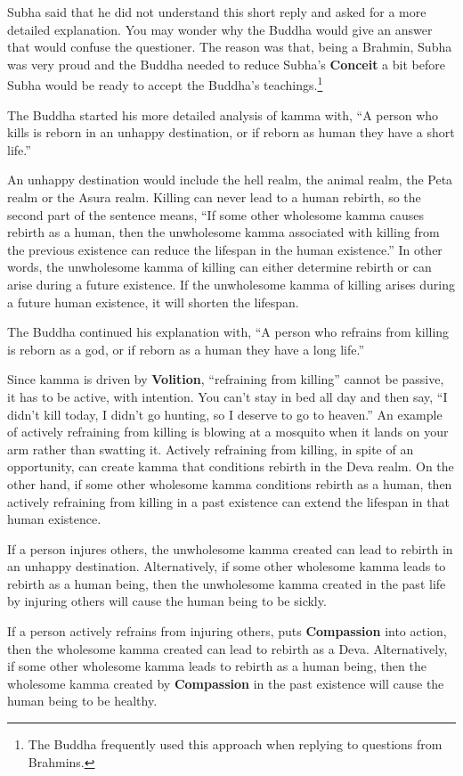 Subha said that he did not understand this short reply and asked for a more detailed explanation. You may wonder why the Buddha would give an answer that would confuse the questioner. The reason was that, being a Brahmin, Subha was very proud and the Buddha needed to reduce Subha’s \textbf{Conceit} a bit before Subha would be ready to accept the Buddha’s teachings.\footnote{The Buddha frequently used this approach when replying to questions from Brahmins.}

The Buddha started his more detailed analysis of kamma with, “A person who kills is reborn in an unhappy destination, or if reborn as human they have a short life.” 

An unhappy destination would include the hell realm, the animal realm, the Peta realm or the Asura realm. Killing can never lead to a human rebirth, so the second part of the sentence means, “If some other wholesome kamma causes rebirth as a human, then the unwholesome kamma associated with killing from the previous existence can reduce the lifespan in the human existence.” In other words, the unwholesome kamma of killing can either determine rebirth or can arise during a future existence. If the unwholesome kamma of killing arises during a future human existence, it will shorten the lifespan.

The Buddha continued his explanation with, “A person who refrains from killing is reborn as a god, or if reborn as a human they have a long life.” 

Since kamma is driven by \textbf{Volition}, “refraining from killing” cannot be passive, it has to be active, with intention. You can’t stay in bed all day and then say, “I didn’t kill today, I didn’t go hunting, so I deserve to go to heaven.” An example of actively refraining from killing is blowing at a mosquito when it lands on your arm rather than swatting it. Actively refraining from killing, in spite of an opportunity, can create kamma that conditions rebirth in the Deva realm. On the other hand, if some other wholesome kamma conditions rebirth as a human, then actively refraining from killing in a past existence can extend the lifespan in that human existence.

If a person injures others, the unwholesome kamma created can lead to rebirth in an unhappy destination. Alternatively, if some other wholesome kamma leads to rebirth as a human being, then the unwholesome kamma created in the past life by injuring others will cause the human being to be sickly. 

If a person actively refrains from injuring others, puts \textbf{Compassion} into action, then the wholesome kamma created can lead to rebirth as a Deva. Alternatively, if some other wholesome kamma leads to rebirth as a human being, then the wholesome kamma created by \textbf{Compassion} in the past existence will cause the human being to be healthy.

